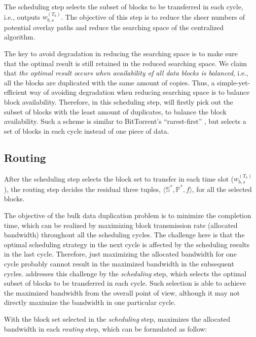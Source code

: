 The scheduling step
selects the subset of blocks to be transferred in each cycle, i.e., 
outputs $w^{(T_k)}_{b,s}$. The objective of this step is to reduce the sheer numbers of potential overlay paths and reduce the searching space of the centralized algorithm.


The key to avoid degradation in reducing the searching space is to make sure that the optimal result is still retained in the reduced searching space. We claim that {\em the optimal result occurs when availability of all data blocks is balanced}, i.e., all the blocks are duplicated with the same amount of copies. Thus, a simple-yet-efficient way of avoiding degradation when reducing searching space is to balance block availability. Therefore, in this scheduling step, \name will firstly pick out the subset of blocks with the least amount of duplicates, to balance the block availability. Such a scheme is similar to BitTorrent's ``rarest-first'' \cite{Cohen2003Incentives}, but \name selects a set of blocks in each cycle instead of one piece of data.


\subsection{Routing}
\label{subsec:logic:routing}

After the scheduling step selects the block set to transfer in each time slot ($w^{(T_k)}_{b,s}$), the routing step decides the residual three tuples, $\langle \mathbb{S}^*, \mathbb{P}^*, f \rangle$, for all the selected blocks.

The objective of the bulk data duplication problem is to minimize the completion time, which can be realized by maximizing block transmission rate (allocated bandwidth) throughout all the scheduling cycles. The challenge here is that the optimal scheduling strategy in the next cycle is affected by the scheduling results in the last cycle. Therefore, just maximizing the allocated bandwidth for one cycle probably cannot result in the maximized bandwidth in the subsequent cycles. \name addresses this challenge by the {\em scheduling} step, which selects the optimal subset of blocks to be transferred in each cycle. Such selection is able to achieve the maximized bandwidth from the overall point of view, although it may not directly maximize the bandwidth in one particular cycle.

With the block set selected in the {\em scheduling} step, \name maximizes the allocated bandwidth in each {\em routing} step, which can be formulated as follow:

